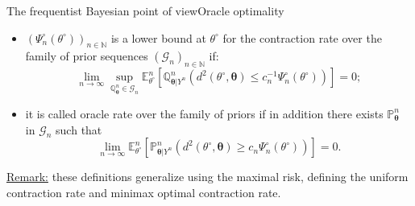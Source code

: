 \documentclass[10pt]{beamer}
\begin{document}
\begin{frame}{The frequentist Bayesian point of view}{Oracle optimality}
\begin{itemize}
\item $\left(\Psi_{n}^{\circ}(\theta^{\circ})\right)_{n \in \mathbb{N}}$ is a lower bound at $\theta^{\circ}$ for the contraction rate over the family of prior sequences $\left(\mathcal{G}_{n}\right)_{n \in \mathbb{N}}$ if:
\[\lim\limits_{n \rightarrow \infty} \sup\limits_{\mathbb{Q}_{\boldsymbol{\theta}}^{n}\in \mathcal{G}_{n}} \mathbb{E}_{\theta^{\circ}}^{n}\left[\mathbb{Q}_{\boldsymbol{\theta}\vert Y^{n}}^{n}\left(d^{2}\left(\theta^{\circ}, \boldsymbol{\theta}\right) \leq c_{n}^{-1}\Psi_{n}^{\circ}(\theta^{\circ})\right)\right] = 0;\]
\item it is called oracle rate over the family of priors if in addition there exists $\mathbb{P}_{\boldsymbol{\theta}}^{n}$ in $\mathcal{G}_{n}$ such that
\[\lim\limits_{n \rightarrow \infty} \mathbb{E}_{\theta^{\circ}}^{n}\left[\mathbb{P}_{\boldsymbol{\theta}\vert Y^{n}}^{n}\left(d^{2}\left(\theta^{\circ}, \boldsymbol{\theta}\right) \geq c_{n} \Psi_{n}^{\circ}(\theta^{\circ}) \right)\right] = 0.\]
\end{itemize}

\bigskip
\bigskip

\underline{Remark:} these definitions generalize using the maximal risk, defining the uniform contraction rate and minimax optimal contraction rate.
\end{frame}
\end{document}
